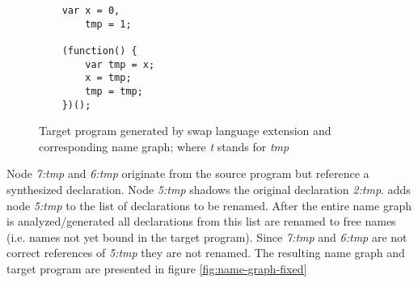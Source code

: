 \begin{figure}[h]
\centering
\begin{minipage}{0.25\linewidth}
\begin{lstlisting}
	var x = 0,
		tmp = 1;

	(function() {
		var tmp = x;
		x = tmp;
		tmp = tmp;
	})();
\end{lstlisting}
\end{minipage}
\hfill
\begin{minipage}{0.65\linewidth}
\end{minipage}

\caption{Target program generated by swap language extension and corresponding name graph; where \textit{t} stands for \textit{tmp}} \label{fig:name-graph}
\end{figure}

Node \textit{7:tmp} and \textit{6:tmp} originate from the source program but reference a synthesized declaration. Node \textit{5:tmp} shadows the original declaration \textit{2:tmp}. \textit{\vfix} adds node \textit{5:tmp} to the list of declarations to be renamed. After the entire name graph is analyzed/generated all declarations from this list are renamed to free names (i.e. names not yet bound in the target program). Since \textit{7:tmp} and \textit{6:tmp} are not correct references of \textit{5:tmp} they are not renamed. The resulting name graph and target program are presented in figure \ref{fig:name-graph-fixed}

